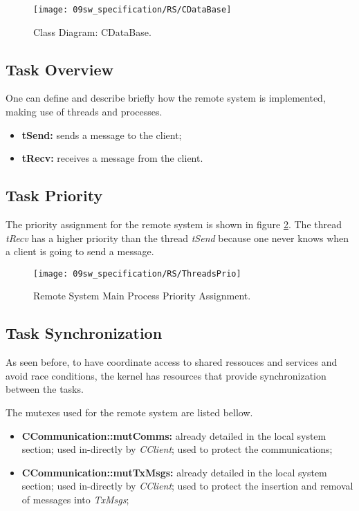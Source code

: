 \begin{figure}[H]
	\centering
	\texttt{[image: 09sw\_specification/RS/CDataBase]}
	\caption{Class Diagram: CDataBase.}
	\label{fig:CDataBase}
\end{figure}

\subsection{Task Overview}
One can define and describe briefly how the remote system is implemented, making use of threads and processes. 

\begin{itemize}
	\item \textbf{tSend:} sends a message to the client;
	\item \textbf{tRecv:} receives a message from the client.
\end{itemize}

\subsection{Task Priority}
The priority assignment for the remote system is shown in figure \ref{fig:rsPrio}. The thread \textit{tRecv} has a higher priority than the thread \textit{tSend} because one never knows when a client is going to send a message. 

\begin{figure}[H]
	\centering
	\texttt{[image: 09sw\_specification/RS/ThreadsPrio]}
	\caption{Remote System Main Process Priority Assignment.}
	\label{fig:rsPrio}
\end{figure}

\subsection{Task Synchronization}
As seen before, to have coordinate access to shared ressouces and services and avoid race conditions, the kernel has resources that provide synchronization between the tasks. 


The mutexes used for the remote system are listed bellow.

\begin{itemize}
	\item \textbf{CCommunication::mutComms:} already detailed in the local system section; used in-directly by \textit{CClient}; used to protect the communications;
	\item \textbf{CCommunication::mutTxMsgs:} already detailed in the local system section; used in-directly by \textit{CClient}; used to protect the insertion and removal of messages into \textit{TxMsgs};
\end{itemize}

